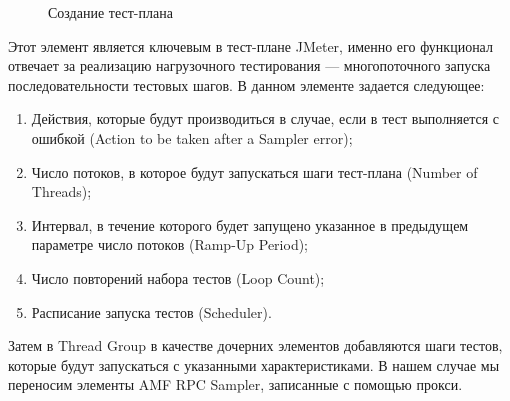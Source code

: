\begin{figure}[ht]
\caption{Создание тест-плана}
\label{ris:testplan.png}
\end{figure}

Этот элемент является ключевым в тест-плане JMeter, именно его функционал отвечает за реализацию
нагрузочного тестирования --- многопоточного запуска последовательности тестовых шагов.
В данном элементе задается следующее:

\begin{enumerate}
\item Действия, которые будут производиться в случае, если в тест выполняется с ошибкой
(Action to be taken after a Sampler error);
\item Число потоков, в которое будут запускаться шаги тест-плана (Number of Threads);
\item Интервал, в течение которого будет запущено указанное в предыдущем параметре
число потоков (Ramp-Up Period);
\item Число повторений набора тестов (Loop Count);
\item Расписание запуска тестов (Scheduler).
\end{enumerate}

Затем в Thread Group в качестве дочерних элементов добавляются шаги тестов, которые
будут запускаться с указанными характеристиками. В нашем случае мы переносим элементы
AMF RPC Sampler, записанные с помощью прокси.


